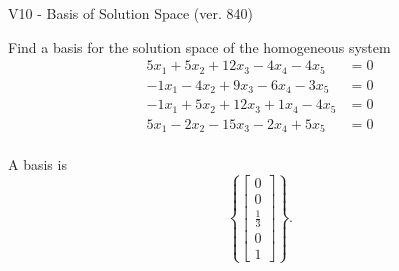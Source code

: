 \begin{exercise}
  \begin{exerciseTitle}V10 - Basis of Solution Space (ver. 840)\end{exerciseTitle}
  \begin{exerciseStatement}
    Find a basis for the solution space of the homogeneous system 
\begin{align*}
 5 x_ 1 + 5 x_ 2 + 12 x_ 3 -4 x_ 4 -4 x_ 5 &= 0  \\ 
  -1 x_ 1 -4 x_ 2 + 9 x_ 3 -6 x_ 4 -3 x_ 5 &= 0  \\ 
  -1 x_ 1 + 5 x_ 2 + 12 x_ 3 + 1 x_ 4 -4 x_ 5 &= 0  \\ 
  5 x_ 1 -2 x_ 2 -15 x_ 3 -2 x_ 4 + 5 x_ 5 &= 0  \\ 
 \end{align*}


 
  \end{exerciseStatement}

  \begin{exerciseAnswer}
   A basis is   
\[\left\{\left[\begin{array}{c}
0 \\
0 \\
\frac{1}{3} \\
0 \\
1
\end{array}\right]\right\}.\]

  


  \end{exerciseAnswer}
\end{exercise}